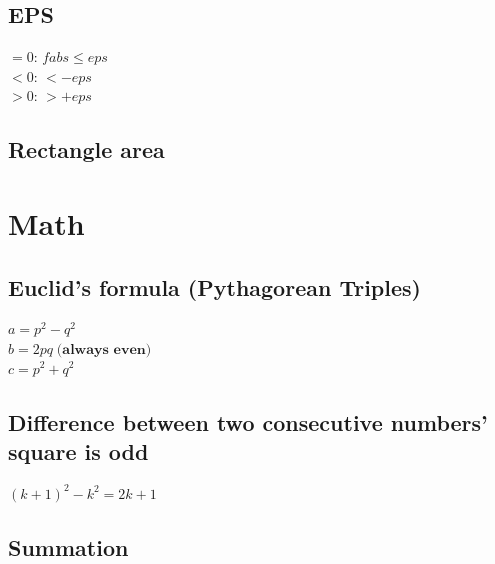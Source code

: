 \documentclass[10pt,oneside]{article}
\begin{document}
\begin{landscape}
\begin{multicols}{2}
				\subsection{EPS}
				
				{\normalsize 
					
					$=0$: $fabs \leq eps$\\
					$<0$: $ < -eps$\\
					$>0$: $ > +eps$
				}
				
				
				\subsection{Rectangle area}
				
				\section{Math}
				
				\subsection{Euclid's formula (Pythagorean Triples)}
				
				{\normalsize 
					$a = p^2 - q^2 $\\
					$b = 2pq \; \textbf{(always even)}$ \\
					$c = p^2 + q^2$\\
				}
				
				\subsection{Difference between two consecutive numbers' square is odd}
				
				{\normalsize 
					$(k + 1)^2 - k^2 = 2k + 1$
				}
				
				\subsection{Summation}
				

\end{multicols}
\end{landscape}
\end{document}
